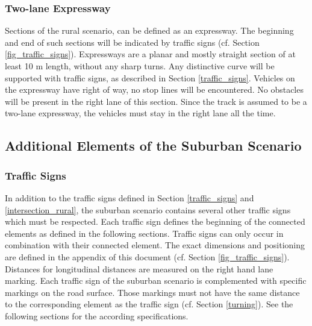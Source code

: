 \subsubsection{Two-lane Expressway}

Sections of the rural scenario, can be defined as an expressway. The beginning
and end of such sections will be indicated by traffic signs (cf. Section
\ref{fig_traffic_signs}). Expressways are a planar and mostly straight section
of at least 10 m length, without any sharp turns. Any distinctive curve will be
supported with traffic signs, as described in Section \ref{traffic_signs}.
Vehicles on the expressway have right of way, no stop lines will be
encountered. No obstacles will be present in the right lane of this section.
Since the track is assumed to be a two-lane expressway, the vehicles must stay
in the right lane all the time.

\subsection{Additional Elements of the Suburban Scenario}
\label{elements_suburban_scenario}
\subsubsection{Traffic Signs}

In addition to the traffic signs defined in Section \ref{traffic_signs} and
\ref{intersection_rural}, the suburban scenario contains several other traffic
signs which must be respected. Each traffic sign defines the beginning of the
connected elements as defined in the following sections. Traffic signs can only
occur in combination with their connected element. The exact dimensions and
positioning are defined in the appendix of this document (cf. Section
\ref{fig_traffic_signs}). Distances for longitudinal distances are measured on
the right hand lane marking. Each traffic sign of the suburban scenario is
complemented with specific markings on the road surface. Those markings must
not have the same distance to the corresponding element as the traffic sign
(cf. Section \ref{turning}). See the following sections for the according
specifications.

